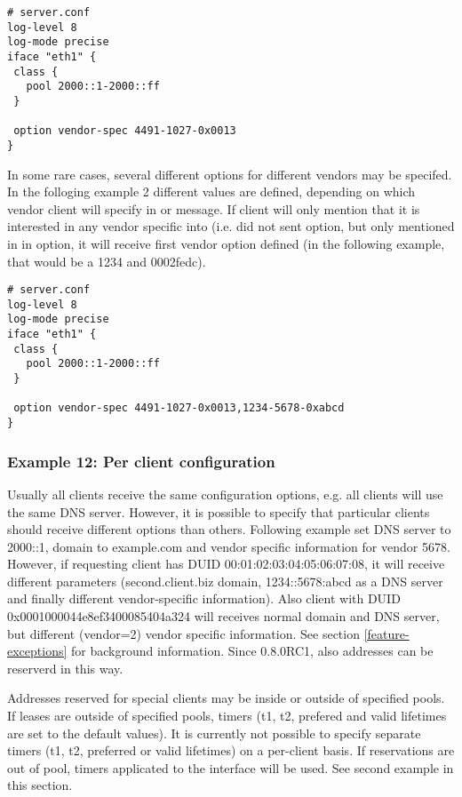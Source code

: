 \begin{lstlisting}
# server.conf
log-level 8
log-mode precise
iface "eth1" {
 class {
   pool 2000::1-2000::ff
 }

 option vendor-spec 4491-1027-0x0013
}
\end{lstlisting}

In some rare cases, several different options for different vendors
may be specifed. In the folloging example 2 different values are
defined, depending on which vendor client will specify in  or
 message. If client will only mention that it is interested in
any vendor specific into (i.e. did not sent  option, but
only mentioned in in  option, it will receive
first vendor option defined (in the following example, that would be a
1234 and 0002fedc).

\begin{lstlisting}
# server.conf
log-level 8
log-mode precise
iface "eth1" {
 class {
   pool 2000::1-2000::ff
 }

 option vendor-spec 4491-1027-0x0013,1234-5678-0xabcd
}
\end{lstlisting}

\subsubsection{Example 12: Per client configuration}
\label{example-server-exceptions}
Usually all clients receive the same configuration options, e.g. all
clients will use the same DNS server. However, it is possible to
specify that particular clients should receive different options than
others. Following example set DNS server to 2000::1, domain
to example.com and vendor specific information for vendor 5678.
However, if requesting client has DUID 00:01:02:03:04:05:06:07:08, it
will receive different parameters (second.client.biz domain,
1234::5678:abcd as a DNS server and finally different vendor-specific
information). Also client with DUID 0x0001000044e8ef3400085404a324
will receives normal domain and DNS server, but different (vendor=2)
vendor specific information. See section \ref{feature-exceptions} for
background information. Since 0.8.0RC1, also addresses can be reserverd
in this way.

Addresses reserved for special clients may be inside or outside of
specified pools. If leases are outside of specified pools, timers (t1,
t2, prefered and valid lifetimes are set to the default values). It is
currently not possible to specify separate timers (t1, t2, preferred
or valid lifetimes) on a per-client basis. If reservations are out of
pool, timers applicated to the interface will be used. See second
example in this section.

